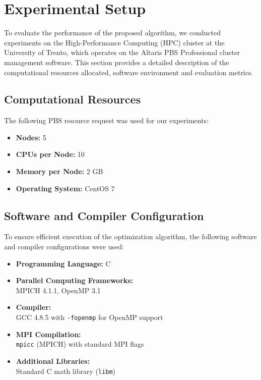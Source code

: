\section{Experimental Setup}

To evaluate the performance of the proposed algorithm, we conducted experiments on the High-Performance Computing (HPC) cluster at the University of Trento, which operates on the Altaris PBS Professional cluster management software.  
This section provides a detailed description of the computational resources allocated, software environment and evaluation metrics. 


\subsection{Computational Resources}  
The following PBS resource request was used for our experiments:  
\begin{multicols}{2}
\begin{itemize}  
    \item \textbf{Nodes:} 5  
    \item \textbf{CPUs per Node:} 10  
    \item \textbf{Memory per Node:} 2 GB  
    \item \textbf{Operating System:} CentOS 7  
\end{itemize}  
\end{multicols}

\subsection{Software and Compiler Configuration}
To ensure efficient execution of the optimization algorithm, the following software and compiler configurations were used:
\begin{multicols}{2}
\begin{itemize}
    \item \textbf{Programming Language:}  C
    \item \textbf{Parallel Computing Frameworks:} \\ MPICH 4.1.1, OpenMP 3.1
    \item \textbf{Compiler:} \\ GCC 4.8.5 with \texttt{-fopenmp} for OpenMP support
    \item \textbf{MPI Compilation:} \\ \texttt{mpicc} (MPICH) with standard MPI flags
    \item \textbf{Additional Libraries:} \\ Standard C math library (\texttt{libm})
\end{itemize}  
\end{multicols}


